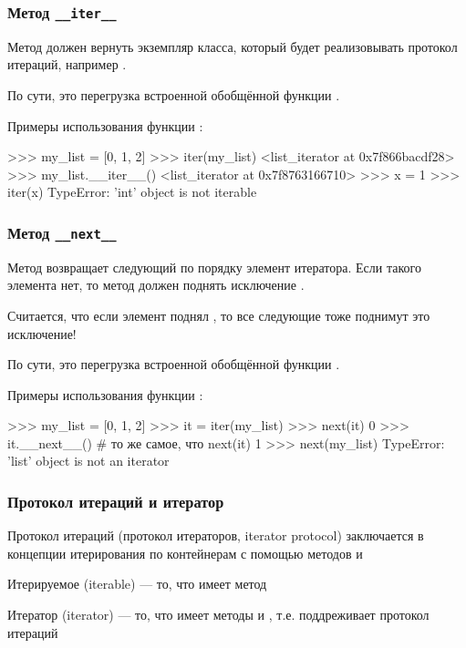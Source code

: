\documentclass[fleqn, xcolor=x11names]{beamer}
\begin{document}
\begin{frame}[fragile]\frametitle{Метод \texttt{\_\_iter\_\_}}
Метод  должен вернуть экземпляр класса, который будет реализовывать протокол итераций, например .

\hfill

По сути, это перегрузка встроенной обобщённой функции .

\hfill

Примеры использования функции :
\begin{pcode}
>>> my_list = [0, 1, 2]
>>> iter(my_list)
<list_iterator at 0x7f866bacdf28>
>>> my_list.__iter__()
<list_iterator at 0x7f8763166710>
>>> x = 1
>>> iter(x)
TypeError: 'int' object is not iterable
\end{pcode}
\end{frame}



\begin{frame}[fragile]\frametitle{Метод \texttt{\_\_next\_\_}}
Метод  возвращает следующий по порядку
элемент итератора. Если такого элемента нет, то метод
должен поднять исключение .

Считается, что если элемент поднял , то все следующие тоже поднимут это исключение!


\hfill


По сути, это перегрузка встроенной обобщённой функции .
  
\hfill

Примеры использования функции :
\begin{pcode}
>>> my_list = [0, 1, 2]
>>> it = iter(my_list)
>>> next(it)
0
>>> it.__next__() # то же самое, что next(it)
1
>>> next(my_list)
TypeError: 'list' object is not an iterator
\end{pcode}
\end{frame}

\begin{frame}[fragile]\frametitle{Протокол итераций и итератор}
Протокол итераций (протокол итераторов, iterator protocol) заключается в концепции итерирования по контейнерам с помощью методов  и 

\hfill

Итерируемое (iterable) --- то, что имеет метод 

\hfill

Итератор (iterator) --- то, что имеет методы  и , т.е. поддреживает протокол итераций

\end{frame}
\end{document}

